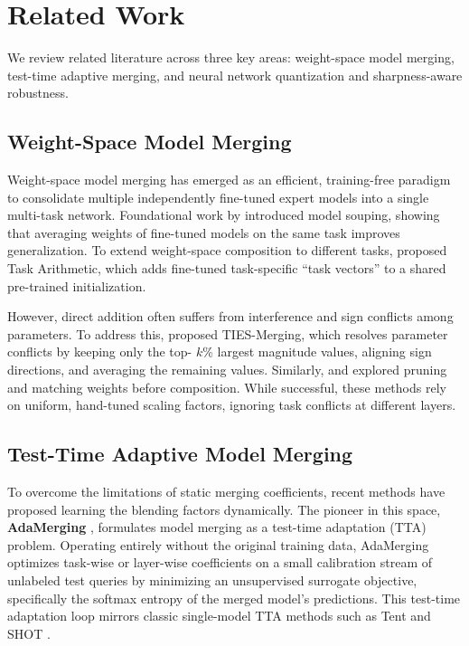 \section{Related Work}
\label{sec:related_work}

We review related literature across three key areas: weight-space model merging, test-time adaptive merging, and neural network quantization and sharpness-aware robustness.

\subsection{Weight-Space Model Merging}
Weight-space model merging has emerged as an efficient, training-free paradigm to consolidate multiple independently fine-tuned expert models into a single multi-task network. Foundational work by \citet{model_soups} introduced model souping, showing that averaging weights of fine-tuned models on the same task improves generalization. To extend weight-space composition to different tasks, \citet{task_vectors} proposed Task Arithmetic, which adds fine-tuned task-specific ``task vectors'' to a shared pre-trained initialization. 

However, direct addition often suffers from interference and sign conflicts among parameters. To address this, \citet{ties_merging} proposed TIES-Merging, which resolves parameter conflicts by keeping only the top- $k$\% largest magnitude values, aligning sign directions, and averaging the remaining values. Similarly, \citet{zipmerge} and \citet{symerge} explored pruning and matching weights before composition. While successful, these methods rely on uniform, hand-tuned scaling factors, ignoring task conflicts at different layers.

\subsection{Test-Time Adaptive Model Merging}
To overcome the limitations of static merging coefficients, recent methods have proposed learning the blending factors dynamically. The pioneer in this space, \textbf{AdaMerging} \cite{adamerging}, formulates model merging as a test-time adaptation (TTA) problem. Operating entirely without the original training data, AdaMerging optimizes task-wise or layer-wise coefficients on a small calibration stream of unlabeled test queries by minimizing an unsupervised surrogate objective, specifically the softmax entropy of the merged model's predictions. This test-time adaptation loop mirrors classic single-model TTA methods such as Tent \cite{tent} and SHOT \cite{shot}. 

